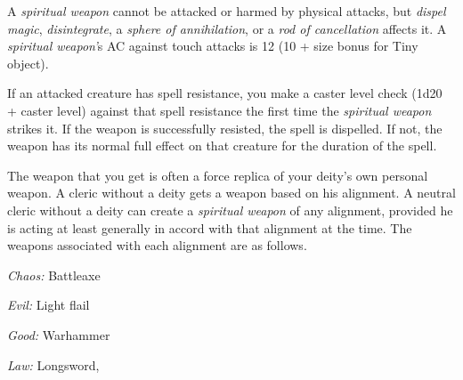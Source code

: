 A \textit{spiritual weapon} cannot be attacked or harmed by physical attacks, but 
\textit{dispel magic}, \textit{disintegrate}, a \textit{sphere of annihilation}, 
or a \textit{rod of cancellation} affects it. A \textit{spiritual weapon'}s AC 
against touch attacks is 12 (10 + size bonus for Tiny object).

If an attacked creature has spell resistance, you make a caster level check (1d20 
+ caster level) against that spell resistance the first time the \textit{spiritual 
weapon} strikes it. If the weapon is successfully resisted, the spell is dispelled. 
If not, the weapon has its normal full effect on that creature for the duration 
of the spell.

The weapon that you get is often a force replica of your deity's own personal weapon. 
A cleric without a deity gets a weapon based on his alignment. A neutral cleric 
without a deity can create a \textit{spiritual weapon} of any alignment, provided 
he is acting at least generally in accord with that alignment at the time. The 
weapons associated with each alignment are as follows.

\textit{Chaos:} Battleaxe

\textit{Evil:} Light flail

\textit{Good:} Warhammer

\textit{Law:} Longsword, 

